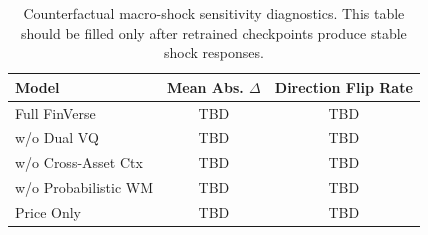 \begin{table}[t]
\centering
\caption{Counterfactual macro-shock sensitivity diagnostics. This table should be filled only after retrained checkpoints produce stable shock responses.}
\label{tab:counterfactual_sensitivity}
\begin{tabular}{lcc}
\toprule
Model & Mean Abs. $\Delta$ & Direction Flip Rate \\
\midrule
Full FinVerse & TBD & TBD \\
w/o Dual VQ & TBD & TBD \\
w/o Cross-Asset Ctx & TBD & TBD \\
w/o Probabilistic WM & TBD & TBD \\
Price Only & TBD & TBD \\
\bottomrule
\end{tabular}
\end{table}
